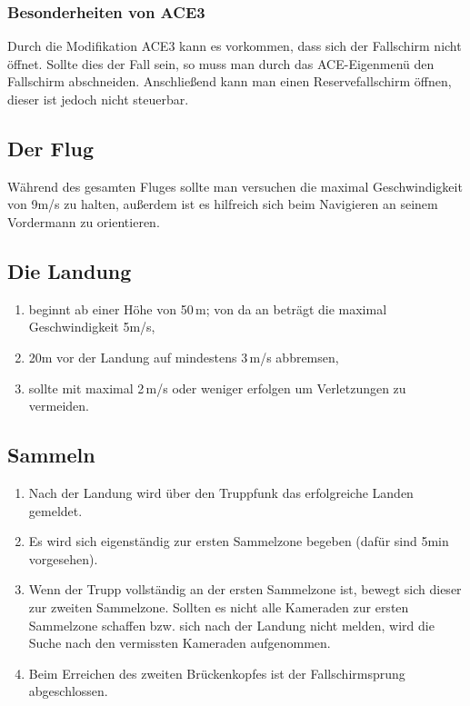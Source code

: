 \subsubsection*{Besonderheiten von ACE3}
	Durch die Modifikation ACE3 kann es vorkommen, dass sich der Fallschirm nicht öffnet. Sollte dies der Fall sein, so muss man durch das ACE-Eigenmenü  den Fallschirm abschneiden. Anschließend kann man einen Reservefallschirm öffnen, dieser ist jedoch nicht steuerbar.

\subsection{Der Flug}
	Während des gesamten Fluges sollte man versuchen die maximal Geschwindigkeit von 9m/s zu halten, außerdem ist es hilfreich sich beim Navigieren an seinem Vordermann zu orientieren.

\subsection{Die Landung}
\begin{enumerate}
	\item beginnt ab einer Höhe von 50\,m; von da an beträgt die maximal Geschwindigkeit 5m/s,
	\item 20m vor der Landung auf mindestens 3\,m/s abbremsen,
	\item sollte mit maximal 2\,m/s oder weniger erfolgen um Verletzungen zu vermeiden.
\end{enumerate}

\subsection{Sammeln}
\begin{enumerate}
	\item Nach der Landung wird über den Truppfunk das erfolgreiche Landen gemeldet.
	\item Es wird sich eigenständig zur ersten Sammelzone begeben (dafür sind 5min vorgesehen).
	\item Wenn der Trupp vollständig an der ersten Sammelzone ist, bewegt sich dieser zur zweiten
	Sammelzone. Sollten es nicht alle Kameraden zur ersten Sammelzone schaffen bzw. sich
	nach der Landung nicht melden, wird die Suche nach den vermissten Kameraden
	aufgenommen.
	\item Beim Erreichen des zweiten Brückenkopfes ist der Fallschirmsprung abgeschlossen.
\end{enumerate}	